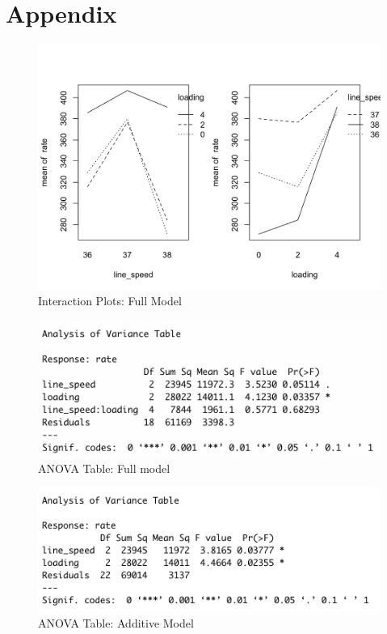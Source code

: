 \documentclass[11pt,a4paper]{article}
\begin{document}
\newpage
\section{Appendix}
\begin{figure}[htb]
    \centering
    \includegraphics[scale=0.3]{inter1.png}
    \caption{Interaction Plots: Full Model}
    \label{}
\end{figure}
\begin{figure}[htb]
    \centering
    \includegraphics[scale=0.8]{inter2.png}
    \caption{ANOVA Table: Full model}
    \label{}
\end{figure}

\begin{figure}[htb]
    \centering
    \includegraphics[scale=0.8]{add1.png}
    \caption{ANOVA Table: Additive Model}
    \label{}
\end{figure}
\end{document}
